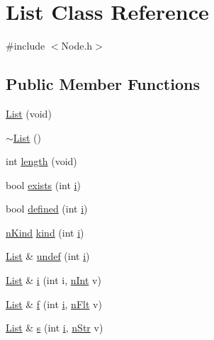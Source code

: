 \hypertarget{classList}{}\section{List Class Reference}
\label{classList}


{\ttfamily \#include $<$Node.\+h$>$}

\subsection*{Public Member Functions}
\begin{DoxyCompactItemize}
\item 
\mbox{\hyperlink{classList_a30ca8f76a69a1af031025aedcbae29d0}{List}} (void)
\item 
\mbox{\hyperlink{classList_a70aecf37bd9d779a394e4d50377fbf5f}{$\sim$\+List}} ()
\item 
int \mbox{\hyperlink{classList_afb8e3165e3c58d1eeaba6c5a53c834fe}{length}} (void)
\item 
bool \mbox{\hyperlink{classList_aaf10ec6ce3eaf345c726ca21c54bbe74}{exists}} (int \mbox{\hyperlink{classList_a30bdcd4df3cff7fd3233f5f6ee0c9df4}{i}})
\item 
bool \mbox{\hyperlink{classList_af3048d8d98d9a42aff144776735848a9}{defined}} (int \mbox{\hyperlink{classList_a30bdcd4df3cff7fd3233f5f6ee0c9df4}{i}})
\item 
\mbox{\hyperlink{Node_8h_a0ec4934d366e0d191f86c6ca9c1a922f}{n\+Kind}} \mbox{\hyperlink{classList_a70216a15650bc17404eab4ea51d822b6}{kind}} (int \mbox{\hyperlink{classList_a30bdcd4df3cff7fd3233f5f6ee0c9df4}{i}})
\item 
\mbox{\hyperlink{classList}{List}} \& \mbox{\hyperlink{classList_a9275058bc4c1875ca1f46733db291399}{undef}} (int \mbox{\hyperlink{classList_a30bdcd4df3cff7fd3233f5f6ee0c9df4}{i}})
\item 
\mbox{\hyperlink{classList}{List}} \& \mbox{\hyperlink{classList_a30bdcd4df3cff7fd3233f5f6ee0c9df4}{i}} (int i, \mbox{\hyperlink{Node_8h_a17693eab3c96e5b590641f884a5a6ff1}{n\+Int}} v)
\item 
\mbox{\hyperlink{classList}{List}} \& \mbox{\hyperlink{classList_adb526b9d6b74b47c3f49d34aff737753}{f}} (int \mbox{\hyperlink{classList_a30bdcd4df3cff7fd3233f5f6ee0c9df4}{i}}, \mbox{\hyperlink{Node_8h_aa7fdace1cf021510d341a4ce92e2223a}{n\+Flt}} v)
\item 
\mbox{\hyperlink{classList}{List}} \& \mbox{\hyperlink{classList_a4e0ac152caad60fba66fdca9c5fe6dd1}{s}} (int \mbox{\hyperlink{classList_a30bdcd4df3cff7fd3233f5f6ee0c9df4}{i}}, \mbox{\hyperlink{Node_8h_a0d7591b97fcccd83c3c2ce469c8bc25c}{n\+Str}} v)

\end{DoxyCompactItemize}
